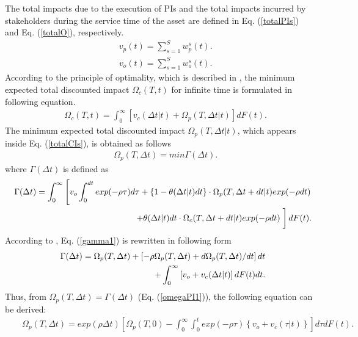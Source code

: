 The total impacts due to the execution of PIs and the total impacts incurred by stakeholders during the service time of the asset are defined in Eq. (\ref{totalPIs}) and Eq. (\ref{totalO}), respectively.
\begin{eqnarray}
&& v_p (t) =\sum_{s=1}^{S}w_{p}^s (t)  .\label{totalPIs}
\end{eqnarray}
\begin{eqnarray}
&& v_o (t) =\sum_{s=1}^{S}w_{o}^s (t)  .\label{totalO}
\end{eqnarray}
According to the principle of optimality, which is described in \cite[p. 15]{Bellman1962}, the minimum expected total discounted impact $\Omega_{c}(T,t)$ for infinite time is formulated in following equation.
\begin{eqnarray}
&& \Omega_{c}(T,t) = \int_0^{\infty} \left[ {v_c(\Delta t|t)} + \Omega_{p}(T,\Delta t|t)  \right] dF(t).\label{omegaCI1}
\end{eqnarray}
The minimum expected total discounted impact $ \Omega_{p}(T,\Delta t|t) $, which appears inside Eq. (\ref{totalCIs}), is obtained as follows
\begin{eqnarray}
&& \Omega_{p}(T,\Delta t) = min \Gamma (\Delta t) .\label{omegaPI1}
\end{eqnarray}
where $\Gamma (\Delta t)$ is defined as
\begin{eqnarray}
&& \Gamma (\Delta t) = \int_0^{\infty} \left[ v_o \int_0^{dt} exp(-\rho \tau)d\tau  + \left\{ {1-\theta(\Delta t|t)dt} \right\}\cdot \Omega_p(T,\Delta t+dt|t) exp(-\rho dt) \right. \nonumber \\
&&  \hspace{20mm} +  \theta(\Delta t|t)dt \cdot \Omega_c(T,\Delta t+dt|t)exp(-\rho dt) \left.\vphantom{\int_t} \right] dF(t).\label{gamma1}
\end{eqnarray}
According to \cite{Kaio1984}, Eq. (\ref{gamma1}) is rewritten in following form
\begin{eqnarray}
&& \Gamma (\Delta t) = \Omega_{p}(T,\Delta t) + \left[ -\rho \Omega_{p}(T,\Delta t) +d\Omega_{p}(T,\Delta t)/dt \right]dt \nonumber \\
&& \hspace{30mm} + \int_0^{\infty} \left[ v_o + v_c(\Delta t|t) \right]dF(t)dt.\label{gamma2}
\end{eqnarray}
Thus, from $\Omega_p(T,\Delta t)=\Gamma(\Delta t)$ (Eq. (\ref{omegaPI1})), the following equation can be derived:
\begin{eqnarray}
&& \Omega_p(T,\Delta t) = exp(\rho\Delta t) \left[\Omega_p(T,0)-\int_0^{\infty}\int_0^t exp(-\rho\tau) \left\{ v_o+v_c(\tau|t)\right\} \right]d\tau dF(t)
.\label{omegaPI2}
\end{eqnarray}
